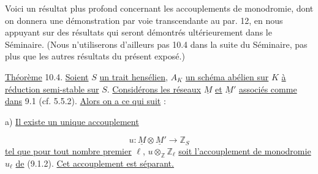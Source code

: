 \begin{center}
\end{center}

Voici un résultat plus profond concernant les accouplements de monodromie, dont on donnera une démonstration par voie transcendante au par. 12, en nous appuyant sur des résultats qui seront démontrés ultérieurement dans le Séminaire. (Nous n'utiliserons d'ailleurs pas 10.4 dans la suite du Séminaire, pas plus que les autres résultats du présent exposé.)



\underline{Théorème} 10.4. \underline{Soient} $S$ \underline{un trait hensélien,} $A_K$ \underline{un schéma abélien sur} $K$ \underline{à réduction semi-stable sur} $S$. \underline{Considérons les réseaux} $\underline{M}$ \underline{et} $\underline{M}'$ \underline{associés comme dans} 9.1 (cf. 5.5.2). \underline{Alors on a ce qui suit} :

a) \underline{Il existe un unique accouplement}

\begin{equation}\tag{10.4.1}
u: \underline{M} \otimes \underline{M}' \longrightarrow \mathbb{Z}_S
\end{equation}
\underline{tel que pour tout nombre premier} $\ell$, $u \otimes_{\mathbb{Z}} \mathbb{Z}_\ell$ \underline{soit l'accouplement de monodromie} $u_\ell$ \underline{de} (9.1.2). \underline{Cet accouplement est séparant.}

